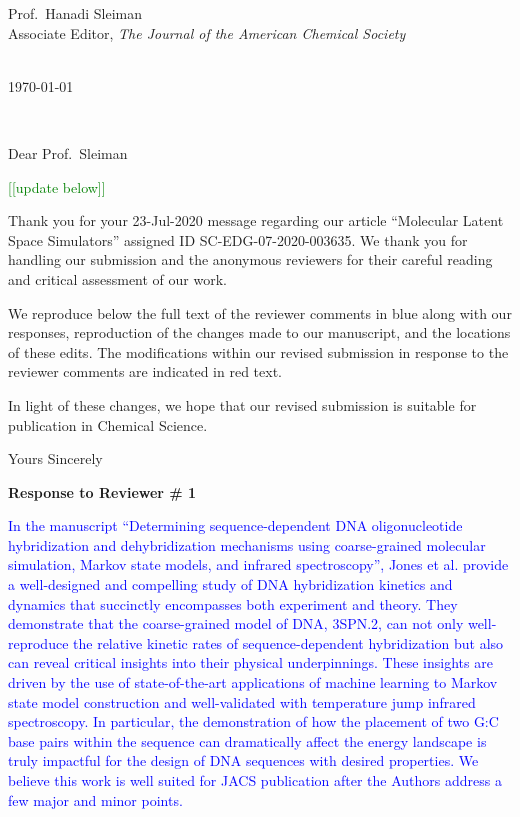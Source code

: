 \documentclass[11pt,a4paper]{letter} %
\makeatletter
\newcommand*{\noteg}[1]{\textcolor{green}{[[#1]]}}		%
\def\opening#1{\thispagestyle{empty}
{\centering\fromaddress \vspace{1.1in} \\ %
%
\hspace*{4.15 in}\today\hspace*{\fill}\par
} %
{\raggedright \toname \\ \toaddress \par} %
\vspace{0.05in} %
\noindent #1 %
}
\makeatother
\begin{document}

\begin{letter}
{
Prof.\ Hanadi Sleiman \\
Associate Editor, \textit{The Journal of the American Chemical Society}
}


\opening{Dear Prof.\ Sleiman}

\noteg{update below} 

Thank you for your 23-Jul-2020 message regarding our article “Molecular Latent Space Simulators” assigned ID SC-EDG-07-2020-003635. We thank you for handling our submission and the anonymous reviewers for their careful reading and critical assessment of our work.

We reproduce below the full text of the reviewer comments in blue along with our responses, reproduction of the changes made to our manuscript, and the locations of these edits. The modifications within our revised submission in response to the reviewer comments are indicated in red text. 

In light of these changes, we hope that our revised submission is suitable for publication in Chemical Science.

\closing{Yours Sincerely}

\end{letter}


\clearpage
\newpage

\begin{shaded}
\textbf{Response to Reviewer \# 1}
\end{shaded}

\textcolor{blue}{In the manuscript “Determining sequence-dependent DNA oligonucleotide hybridization and dehybridization mechanisms using coarse-grained molecular simulation, Markov state models, and infrared spectroscopy”, Jones et al. provide a well-designed and compelling study of DNA hybridization kinetics and dynamics that succinctly encompasses both experiment and theory. They demonstrate that the coarse-grained model of DNA, 3SPN.2, can not only well-reproduce the relative kinetic rates of sequence-dependent hybridization but also can reveal critical insights into their physical underpinnings. These insights are driven by the use of state-of-the-art applications of machine learning to Markov state model construction and well-validated with temperature jump infrared spectroscopy. In particular, the demonstration of how the placement of two G:C base pairs within the sequence can dramatically affect the energy landscape is truly impactful for the design of DNA sequences with desired properties. We believe this work is well suited for JACS publication after the Authors address a few major and minor points.}
\end{document}
